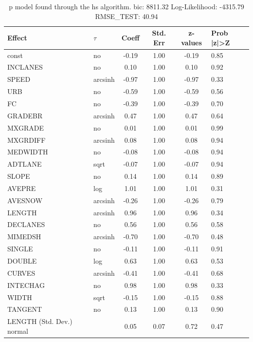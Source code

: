 \begin{table}
	\caption{p model found through the hs algorithm. bic: 8811.32 Log-Likelihood: -4315.79 RMSE_TEST: 40.94}
	\begin{center}
		\begin{tabular}{|l|l|c|c|c|l|}
			\hline
			Effect & $\tau$ & Coeff & Std. Err & z-values & Prob |z|>Z \\
			\hline
			const & no & -0.19 & 1.00 & -0.19 & 0.85 \\
			\hline
			INCLANES & no & 0.10 & 1.00 & 0.10 & 0.92 \\
			\hline
			SPEED & arcsinh & -0.97 & 1.00 & -0.97 & 0.33 \\
			\hline
			URB & no & -0.59 & 1.00 & -0.59 & 0.56 \\
			\hline
			FC & no & -0.39 & 1.00 & -0.39 & 0.70 \\
			\hline
			GRADEBR & arcsinh & 0.47 & 1.00 & 0.47 & 0.64 \\
			\hline
			MXGRADE & no & 0.01 & 1.00 & 0.01 & 0.99 \\
			\hline
			MXGRDIFF & arcsinh & 0.08 & 1.00 & 0.08 & 0.94 \\
			\hline
			MEDWIDTH & no & -0.08 & 1.00 & -0.08 & 0.94 \\
			\hline
			ADTLANE & sqrt & -0.07 & 1.00 & -0.07 & 0.94 \\
			\hline
			SLOPE & no & 0.14 & 1.00 & 0.14 & 0.89 \\
			\hline
			AVEPRE & log & 1.01 & 1.00 & 1.01 & 0.31 \\
			\hline
			AVESNOW & arcsinh & -0.26 & 1.00 & -0.26 & 0.79 \\
			\hline
			LENGTH & arcsinh & 0.96 & 1.00 & 0.96 & 0.34 \\
			\hline
			DECLANES & no & 0.56 & 1.00 & 0.56 & 0.58 \\
			\hline
			MIMEDSH & arcsinh & -0.70 & 1.00 & -0.70 & 0.48 \\
			\hline
			SINGLE & no & -0.11 & 1.00 & -0.11 & 0.91 \\
			\hline
			DOUBLE & log & 0.63 & 1.00 & 0.63 & 0.53 \\
			\hline
			CURVES & arcsinh & -0.41 & 1.00 & -0.41 & 0.68 \\
			\hline
			INTECHAG & no & 0.98 & 1.00 & 0.98 & 0.33 \\
			\hline
			WIDTH & sqrt & -0.15 & 1.00 & -0.15 & 0.88 \\
			\hline
			TANGENT & no & 0.13 & 1.00 & 0.13 & 0.90 \\
			\hline
			LENGTH (Std. Dev.) normal &  & 0.05 & 0.07 & 0.72 & 0.47 \\

\end{tabular}
\end{center}
\end{table}
